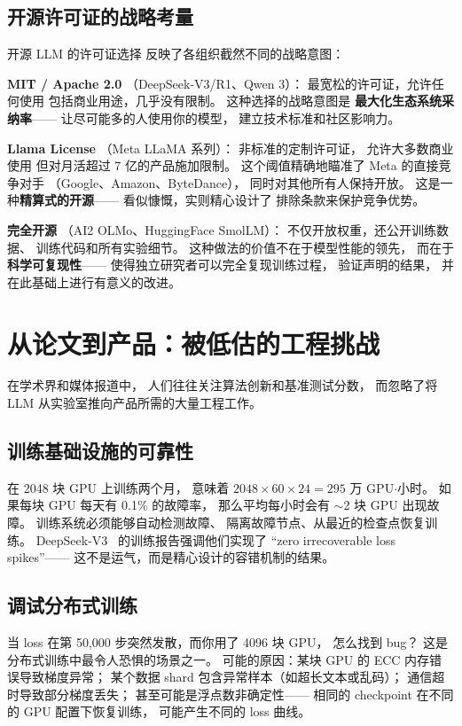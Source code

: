 \subsection{开源许可证的战略考量}

开源 LLM 的许可证选择
反映了各组织截然不同的战略意图：

\textbf{MIT / Apache 2.0}
（DeepSeek-V3/R1、Qwen 3）：
最宽松的许可证，允许任何使用
包括商业用途，几乎没有限制。
这种选择的战略意图是
\textbf{最大化生态系统采纳率}——
让尽可能多的人使用你的模型，
建立技术标准和社区影响力。

\textbf{Llama License}
（Meta LLaMA 系列）：
非标准的定制许可证，
允许大多数商业使用
但对月活超过 7 亿的产品施加限制。
这个阈值精确地瞄准了
Meta 的直接竞争对手
（Google、Amazon、ByteDance），
同时对其他所有人保持开放。
这是一种\textbf{精算式的开源}——
看似慷慨，实则精心设计了
排除条款来保护竞争优势。

\textbf{完全开源}
（AI2 OLMo、HuggingFace SmolLM）：
不仅开放权重，还公开训练数据、
训练代码和所有实验细节。
这种做法的价值不在于模型性能的领先，
而在于\textbf{科学可复现性}——
使得独立研究者可以完全复现训练过程，
验证声明的结果，
并在此基础上进行有意义的改进。

\section{从论文到产品：被低估的工程挑战}

在学术界和媒体报道中，
人们往往关注算法创新和基准测试分数，
而忽略了将 LLM 从实验室推向产品所需的大量工程工作。

\subsection{训练基础设施的可靠性}

在 2048 块 GPU 上训练两个月，
意味着 $2048 \times 60 \times 24 = 295$ 万 GPU$\cdot$小时。
如果每块 GPU 每天有 0.1\% 的故障率，
那么平均每小时会有 $\sim$2 块 GPU 出现故障。
训练系统必须能够自动检测故障、
隔离故障节点、从最近的检查点恢复训练。
DeepSeek-V3~\cite{deepseekv3} 的训练报告强调他们实现了
``zero irrecoverable loss spikes''——
这不是运气，而是精心设计的容错机制的结果。

\subsection{调试分布式训练}

当 loss 在第 50,000 步突然发散，而你用了 4096 块 GPU，
怎么找到 bug？
这是分布式训练中最令人恐惧的场景之一。
可能的原因：某块 GPU 的 ECC 内存错误导致梯度异常；
某个数据 shard 包含异常样本（如超长文本或乱码）；
通信超时导致部分梯度丢失；
甚至可能是浮点数非确定性——
相同的 checkpoint 在不同的 GPU 配置下恢复训练，
可能产生不同的 loss 曲线。

